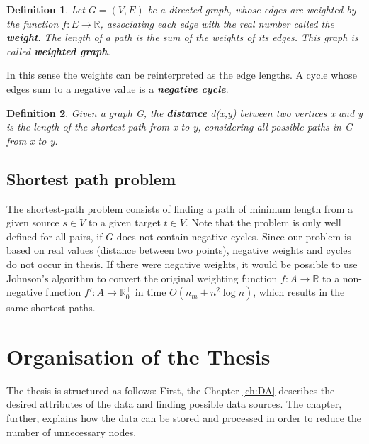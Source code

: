 \documentclass[thesis=M,english]{FITthesis}[2012/10/20]
\newtheorem{defin}{Definition}
\begin{document}
\begin{defin}
Let $G = (V, E)$ be a directed graph, whose edges are weighted by the function $f: E \to \mathbb{R}$, associating each edge with the real number called the \textbf{weight}. 
The length of a path is the sum of the weights of its edges. This graph is called \textbf{weighted graph}.  
\end{defin}

In this sense the weights can be reinterpreted as the edge lengths. A cycle whose edges sum to a negative value is a \textit{\textbf{negative cycle}}. 

\begin{defin}
Given a graph G, the \textbf{distance} d(x,y) between two vertices x and y is the length of the shortest path from x to y, considering all possible paths in G from x to y. 
\end{defin}



\subsection{Shortest path problem}
\label{sec:SPP}


The shortest-path problem consists of finding a path of minimum length from a given source $s \in V$ to a given target $t \in V$.
Note that the problem is only well defined for all pairs, if $G$ does not contain negative cycles.
Since our problem is based on real values (distance between two points), negative weights and cycles do not occur in thesis.
If there were negative weights, it would be possible to use Johnson's algorithm \cite{Johnson77} to convert the original weighting function $f: A \to \mathbb{R}$ to a non-negative function $ f': A \to \mathbb{R}^+_0$ in time $O(n_m + n^2 \log n)$, which results in the same shortest paths.

\section{Organisation of the Thesis}
The thesis is structured as follows: First, the Chapter \ref{ch:DA} describes the desired attributes of the data and finding possible data sources. The chapter, further, explains how the data can be stored and processed in order to reduce the number of unnecessary nodes. 
\end{document}

